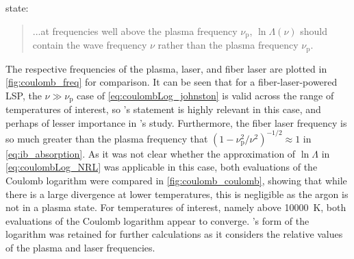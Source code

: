         \textcite{johnstonCorrectValuesHighfrequency1973} state:
        \begin{quote}
            ...at frequencies well above the plasma frequency $\nu_\mathrm{p}$, $\ln{\Lambda}(\nu)$ should contain the wave frequency $\nu$ rather than the plasma frequency $\nu_\mathrm{p}$.
        \end{quote}
        The respective frequencies of the plasma,  laser, and fiber laser are plotted in \autoref{fig:coulomb_freq} for comparison. It can be seen that for a fiber-laser-powered LSP, the $\nu \gg \nu_\mathrm{p}$ case of \autoref{eq:coulombLog_johnston} is valid across the range of temperatures of interest, so \citeauthor{johnstonCorrectValuesHighfrequency1973}'s statement is highly relevant in this case, and perhaps of lesser importance in \citeauthor{nassarInvestigationLasersustainedPlasma2012}'s study. Furthermore, the fiber laser frequency is so much greater than the plasma frequency that $(1-\nu_\mathrm{p}^2/\nu^2)^{-1/2} \approx 1$ in \autoref{eq:ib_absorption}. As it was not clear whether the approximation of $\ln{\Lambda}$ in \autoref{eq:coulombLog_NRL} was applicable in this case, both evaluations of the Coulomb logarithm were compared in \autoref{fig:coulomb_coulomb}, showing that while there is a large divergence at lower temperatures, this is negligible as the argon is not in a plasma state. For temperatures of interest, namely above \qty{10000}{K}, both evaluations of the Coulomb logarithm appear to converge. \citeauthor{johnstonCorrectValuesHighfrequency1973}'s form of the logarithm was retained for further calculations as it considers the relative values of the plasma and laser frequencies.


